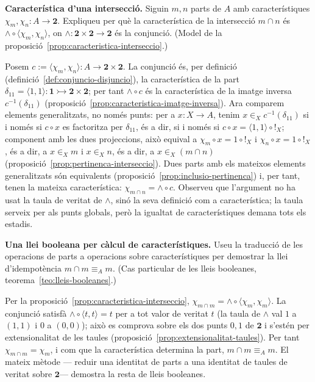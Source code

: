 \begin{exercici}
\textbf{Característica d'una intersecció.} Siguin \(m,n\) parts de \(A\) amb característiques \(\chi_m,\chi_n:A\to\mathbf2\). Expliqueu per què la característica de la intersecció \(m\cap n\) és \(\wedge\circ\langle\chi_m,\chi_n\rangle\), on \(\wedge:\mathbf2\times\mathbf2\to\mathbf2\) és la conjunció. (Model de la proposició~\ref{prop:caracteristica-interseccio}.)
\end{exercici}
\begin{solucio}
Posem \(c:=\langle\chi_m,\chi_n\rangle:A\to\mathbf2\times\mathbf2\). La conjunció és, per definició (definició~\ref{def:conjuncio-disjuncio}), la característica de la part \(\delta_{11}=\langle1,1\rangle:\mathbf1\rightarrowtail\mathbf2\times\mathbf2\); per tant \(\wedge\circ c\) és la característica de la imatge inversa \(c^{-1}(\delta_{11})\) (proposició~\ref{prop:caracteristica-imatge-inversa}). Ara comparem elements generalitzats, no només punts: per a \(x:X\to A\), tenim \(x\in_X c^{-1}(\delta_{11})\) si i només si \(c\circ x\) es factoritza per \(\delta_{11}\), és a dir, si i només si \(c\circ x=\langle1,1\rangle\circ{!}_X\); component amb les dues projeccions, això equival a \(\chi_m\circ x=1\circ{!}_X\) i \(\chi_n\circ x=1\circ{!}_X\), és a dir, a \(x\in_X m\) i \(x\in_X n\), és a dir, a \(x\in_X(m\cap n)\) (proposició~\ref{prop:pertinenca-interseccio}). Dues parts amb els mateixos elements generalitzats són equivalents (proposició~\ref{prop:inclusio-pertinenca}) i, per tant, tenen la mateixa característica: \(\chi_{m\cap n}=\wedge\circ c\). Observeu que l'argument no ha usat la taula de veritat de \(\wedge\), sinó la seva definició com a característica; la taula serveix per als punts globals, però la igualtat de característiques demana tots els estadis.
\end{solucio}

\begin{exercici}
\textbf{Una llei booleana per càlcul de característiques.} Useu la traducció de les operacions de parts a operacions sobre característiques per demostrar la llei d'idempotència \(m\cap m\equiv_A m\). (Cas particular de les lleis booleanes, teorema~\ref{teo:lleis-booleanes}.)
\end{exercici}
\begin{solucio}
Per la proposició~\ref{prop:caracteristica-interseccio}, \(\chi_{m\cap m}=\wedge\circ\langle\chi_m,\chi_m\rangle\). La conjunció satisfà \(\wedge\circ\langle t,t\rangle=t\) per a tot valor de veritat \(t\) (la taula de \(\wedge\) val \(1\) a \((1,1)\) i \(0\) a \((0,0)\)); això es comprova sobre els dos punts \(0,1\) de \(\mathbf2\) i s'estén per extensionalitat de les taules (proposició~\ref{prop:extensionalitat-taules}). Per tant \(\chi_{m\cap m}=\chi_m\), i com que la característica determina la part, \(m\cap m\equiv_A m\). El mateix mètode --- reduir una identitat de parts a una identitat de taules de veritat sobre \(\mathbf2\)--- demostra la resta de lleis booleanes.
\end{solucio}

